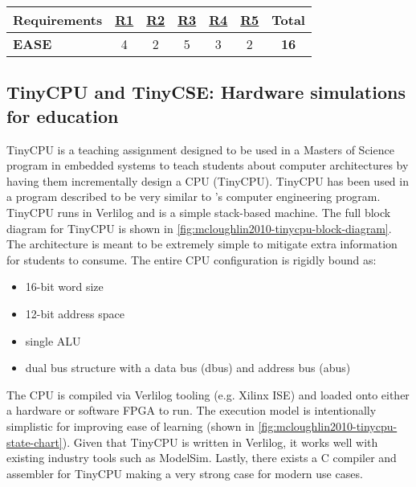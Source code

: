 \begin{table}[h!]
    \centering
    \begin{tabular}{lcccccc}
        \textbf{Requirements} & \textbf{\hyperref[req:personal]{R1}} & \textbf{\hyperref[req:configuration]{R2}} & \textbf{\hyperref[req:pedagogical]{R3}} & \textbf{\hyperref[req:simulations]{R4}} & \textbf{\hyperref[req:modern]{R5}} & \textbf{Total} \\ \hline
        \textbf{EASE}            & 4                                  & 2                                    & 5                            & 3                                  & 2                             & \textbf{16}    \\
    \end{tabular}
\end{table}

\subsection{TinyCPU and TinyCSE: Hardware simulations for education}
\label{sec:review-tiny-cse}

TinyCPU is a teaching assignment designed to be used in a Masters of Science program in embedded systems to teach students about computer architectures by having them incrementally design a CPU (TinyCPU)\cite{McLoughlin2010}. TinyCPU has been used in a program described to be very similar to \uwo's computer engineering program. TinyCPU runs in Verlilog and is a simple stack-based machine. The full block diagram for TinyCPU is shown in \cref{fig:mcloughlin2010-tinycpu-block-diagram}. The architecture is meant to be extremely simple to mitigate extra information for students to consume. The entire CPU configuration is rigidly bound as:
\begin{itemize}
    \item 16-bit word size
    \item 12-bit address space
    \item single ALU
    \item dual bus structure with a data bus (dbus) and address bus (abus)
\end{itemize}
The CPU is compiled via Verlilog tooling (e.g. Xilinx ISE) and loaded onto either a hardware or software FPGA to run. The execution model is intentionally simplistic for improving ease of learning (shown in \cref{fig:mcloughlin2010-tinycpu-state-chart}). Given that TinyCPU is written in Verlilog, it works well with existing industry tools such as ModelSim. Lastly, there exists a C compiler and assembler for TinyCPU making a very strong case for modern use cases. 

